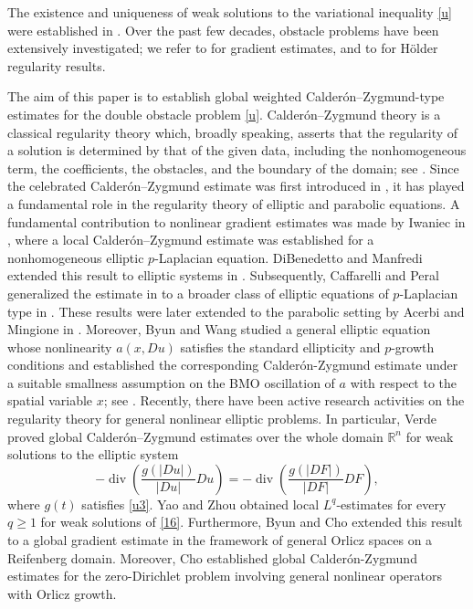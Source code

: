\documentclass[10pt,a4paper]{article}
\theoremstyle{definition}
\numberwithin{equation}{section}
\begin{document}
The existence and uniqueness of weak solutions to the variational inequality \eqref{u} were established in \cite{rt1}. Over the past few decades, obstacle problems have been extensively investigated; we refer to \cite{xiong1, xiong2, xiong3, xiong4, xiong5, xiong6} for   gradient estimates, and to \cite{l2, rt1} for H\"older regularity results.

 


The aim of this paper is to establish global weighted
Calder\'on--Zygmund-type estimates for the double obstacle problem
\eqref{u}. Calder\'on--Zygmund theory is a classical regularity theory
which, broadly speaking, asserts that the regularity of a solution is
determined by that of the given data, including the nonhomogeneous term,
the coefficients, the obstacles, and the boundary of the domain; see \cite{ming1,ming2}. Since the celebrated Calder\'on--Zygmund estimate was first
introduced in \cite{cz1}, it has played a fundamental role in the regularity
theory of elliptic and parabolic equations. 
A fundamental contribution to nonlinear gradient estimates was made by
Iwaniec in \cite{i1}, where a local Calder\'on--Zygmund estimate was established
for a nonhomogeneous elliptic $p$-Laplacian equation. DiBenedetto and
Manfredi extended this result to elliptic systems in \cite{ddm}. Subsequently,
Caffarelli and Peral generalized the estimate in \cite{i1} to a broader class
of elliptic equations of $p$-Laplacian type in \cite{cpp}. These results were later extended to the parabolic setting by
Acerbi and Mingione in \cite{am3}. Moreover, Byun and Wang studied a general elliptic equation whose
nonlinearity $a(x,Du)$ satisfies the standard ellipticity and
$p$-growth conditions and established the corresponding
Calder\'on-Zygmund estimate under a suitable smallness assumption on
the BMO oscillation of $a$ with respect to the spatial variable $x$;
see \cite{bw}.  Recently, there have been active research activities on the regularity
theory for general nonlinear elliptic problems. In particular, Verde
\cite{v} proved global Calder\'on--Zygmund estimates over the whole domain
$\mathbb{R}^{n}$ for weak solutions to the elliptic system 
\begin{equation}\label{16}
	-\operatorname{div}\left( \frac{g(|Du|)}{|Du|}Du\right) 
	=
	-\operatorname{div}\left( \frac{g(|DF|)}{|DF|}DF\right),
\end{equation}
where $g(t)$ satisfies \eqref{u3}. Yao and Zhou \cite{yz1}  obtained local
$L^{q}$-estimates for every $q\geq 1$ for weak solutions of \eqref{16}.
Furthermore, Byun and Cho \cite{bc} extended this result to a global gradient
estimate in the framework of general Orlicz spaces on a Reifenberg
domain. Moreover,  Cho \cite{cho1} established   global Calder\'on-Zygmund estimates for  the
zero-Dirichlet problem involving general nonlinear operators with  Orlicz growth. 
 
\end{document}
